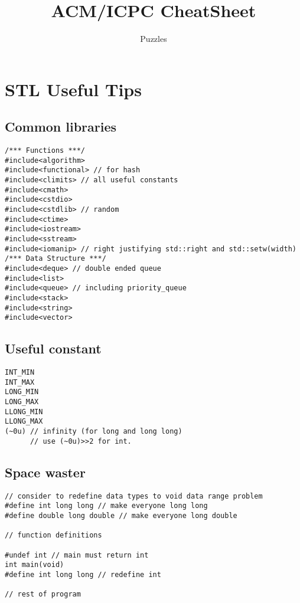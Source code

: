 \documentclass[a4paper]{article}
\title{\textbf{ACM/ICPC CheatSheet}}
\author{Puzzles}
\date{}
\begin{document}
\maketitle
\thispagestyle{empty}
	
{\footnotesize\tableofcontents}

\section{STL Useful Tips}

\subsection{Common libraries}
\begin{verbatim}
/*** Functions ***/
#include<algorithm>
#include<functional> // for hash
#include<climits> // all useful constants
#include<cmath>
#include<cstdio>
#include<cstdlib> // random
#include<ctime>
#include<iostream>
#include<sstream>
#include<iomanip> // right justifying std::right and std::setw(width)
/*** Data Structure ***/
#include<deque> // double ended queue
#include<list>
#include<queue> // including priority_queue
#include<stack>
#include<string>
#include<vector>
\end{verbatim}

\subsection{Useful constant}

\begin{verbatim}
INT_MIN
INT_MAX
LONG_MIN
LONG_MAX
LLONG_MIN
LLONG_MAX
(~0u) // infinity (for long and long long)
      // use (~0u)>>2 for int.
\end{verbatim}

\subsection{Space waster}

\begin{verbatim}
// consider to redefine data types to void data range problem
#define int long long // make everyone long long
#define double long double // make everyone long double

// function definitions

#undef int // main must return int
int main(void)
#define int long long // redefine int

// rest of program
\end{verbatim}
\end{document}
